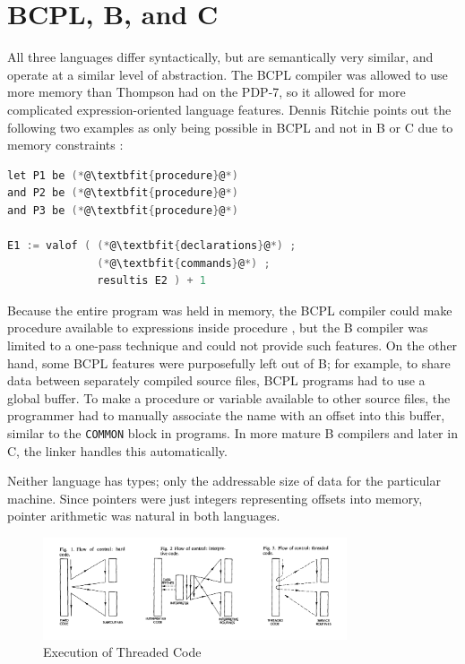 \section{BCPL, B, and C}

All three languages differ syntactically, but are semantically very similar,
and operate at a similar level of abstraction.
The BCPL compiler was allowed to use more memory than Thompson had on the PDP-7,
so it allowed for more complicated expression-oriented language features.
Dennis Ritchie points out the following two examples as only being possible
in BCPL and not in B or C due to memory constraints
\cite{development_of_c_language_ritchie_1996}:

\begin{lstlisting}[language=c,frame=single]
let P1 be (*@\textbfit{procedure}@*)
and P2 be (*@\textbfit{procedure}@*)
and P3 be (*@\textbfit{procedure}@*)

E1 := valof ( (*@\textbfit{declarations}@*) ;
              (*@\textbfit{commands}@*) ;
              resultis E2 ) + 1
\end{lstlisting}

Because the entire program was held in memory, the BCPL compiler could make
procedure  available to expressions inside procedure ,
but the B compiler was limited to a one-pass technique and could not provide such features.
On the other hand, some BCPL features were purposefully left out of B; for example,
to share data between separately compiled source files, BCPL programs had to use
a global buffer. To make a procedure or variable available to other source files,
the programmer had to manually associate the name with an offset into this buffer,
similar to the \texttt{COMMON} block in \ftn{} programs.
In more mature B compilers and later in C, the linker handles this automatically.

Neither language has types; only the addressable size of data for the particular machine.
Since pointers were just integers representing offsets into memory, pointer arithmetic
was natural in both languages.

\begin{figure}[h]
    \centering
    \includegraphics[width=0.8\textwidth]{resource/software/unix/bell-threaded-code-figures.png}
    \caption{Execution of Threaded Code\cite{bell_threaded_code_1973}}
    \label{fig:bell-threaded-code}
\end{figure}

